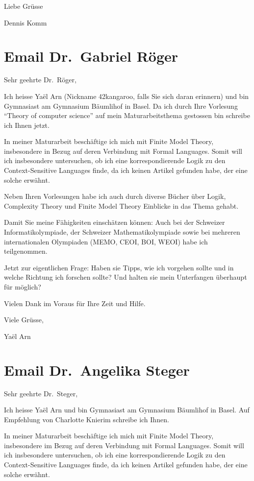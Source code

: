 Liebe Grüsse

Dennis Komm

\section{Email Dr.~Gabriel
Röger}\label{email-dr.-gabriel-ruxf6ger}

Sehr geehrte Dr.~Röger,

Ich heisse Yaël Arn (Nickname 42kangaroo, falls Sie sich daran erinnern)
und bin Gymnasiast am Gymnasium Bäumlihof in Basel. Da ich durch Ihre
Vorlesung ``Theory of computer science'' auf mein Maturarbeitsthema
gestossen bin schreibe ich Ihnen jetzt.

In meiner Maturarbeit beschäftige ich mich mit Finite Model Theory,
insbesondere in Bezug auf deren Verbindung mit Formal Languages. Somit
will ich insbesondere untersuchen, ob ich eine korrespondierende Logik
zu den Context-Sensitive Languages finde, da ich keinen Artikel gefunden
habe, der eine solche erwähnt.

Neben Ihren Vorlesungen habe ich auch durch diverse Bücher über Logik,
Complexity Theory und Finite Model Theory Einblicke in das Thema gehabt.

Damit Sie meine Fähigkeiten einschätzen können: Auch bei der Schweizer
Informatikolympiade, der Schweizer Mathematikolympiade sowie bei
mehreren internationalen Olympiaden (MEMO, CEOI, BOI, WEOI) habe ich
teilgenommen.

Jetzt zur eigentlichen Frage: Haben sie Tipps, wie ich vorgehen sollte
und in welche Richtung ich forschen sollte? Und halten sie mein
Unterfangen überhaupt für möglich?

Vielen Dank im Voraus für Ihre Zeit und Hilfe.

Viele Grüsse,

Yaël Arn

\section{Email Dr.~Angelika
Steger}\label{email-dr.-angelika-steger}

Sehr geehrte Dr.~Steger,

Ich heisse Yaël Arn und bin Gymnasiast am Gymnasium Bäumlihof in Basel.
Auf Empfehlung von Charlotte Knierim schreibe ich Ihnen.

In meiner Maturarbeit beschäftige ich mich mit Finite Model Theory,
insbesondere im Bezug auf deren Verbindung mit Formal Languages. Somit
will ich insbesondere untersuchen, ob ich eine korrespondierende Logik
zu den Context-Sensitive Languages finde, da ich keinen Artikel gefunden
habe, der eine solche erwähnt.

